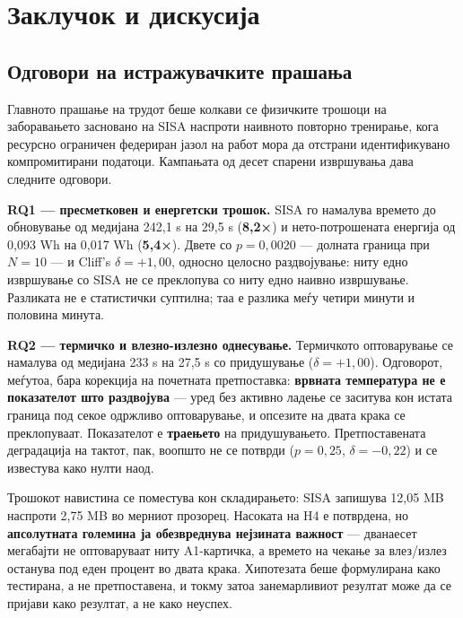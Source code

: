 \chapter{Заклучок и дискусија}
\label{chap:conclusion}

\section{Одговори на истражувачките прашања}

Главното прашање на трудот беше колкави се физичките трошоци на заборавањето засновано на
SISA наспроти наивното повторно тренирање, кога ресурсно ограничен федериран јазол на работ
мора да отстрани идентификувано компромитирани податоци. Кампањата од десет спарени
извршувања дава следните одговори.

\textbf{RQ1 --- пресметковен и енергетски трошок.} SISA го намалува времето до обновување од
медијана 242,1 s на 29,5 s (\textbf{8,2×}) и нето-потрошената енергија од 0,093 Wh на 0,017 Wh
(\textbf{5,4×}). Двете со $p = 0{,}0020$ --- долната граница при $N = 10$ --- и Cliff's
$\delta = +1{,}00$, односно целосно раздвојување: ниту едно извршување со SISA не се
преклопува со ниту едно наивно извршување. Разликата не е статистички суптилна; таа е
разлика меѓу четири минути и половина минута.

\textbf{RQ2 --- термичко и влезно-излезно однесување.} Термичкото оптоварување се намалува од
медијана 233 s на 27,5 s со придушување ($\delta = +1{,}00$). Одговорот, меѓутоа, бара
корекција на почетната претпоставка: \textbf{врвната температура не е показателот што раздвојува} --- уред без активно ладење се заситува кон истата граница под секое одржливо оптоварување, и
опсезите на двата крака се преклопуваат. Показателот е \textbf{траењето} на придушувањето.
Претпоставената деградација на тактот, пак, воопшто не се потврди ($p = 0{,}25$,
$\delta = -0{,}22$) и се известува како нулти наод.

Трошокот навистина се поместува кон складирањето: SISA запишува 12,05 MB наспроти 2,75 MB
во мерниот прозорец. Насоката на H4 е потврдена, но \textbf{апсолутната големина ја обезвреднува
нејзината важност} --- дванаесет мегабајти не оптоваруваат ниту A1-картичка, а времето на
чекање за влез/излез останува под еден процент во двата крака. Хипотезата беше формулирана
како тестирана, а не претпоставена, и токму затоа занемарливиот резултат може да се пријави
како резултат, а не како неуспех.

